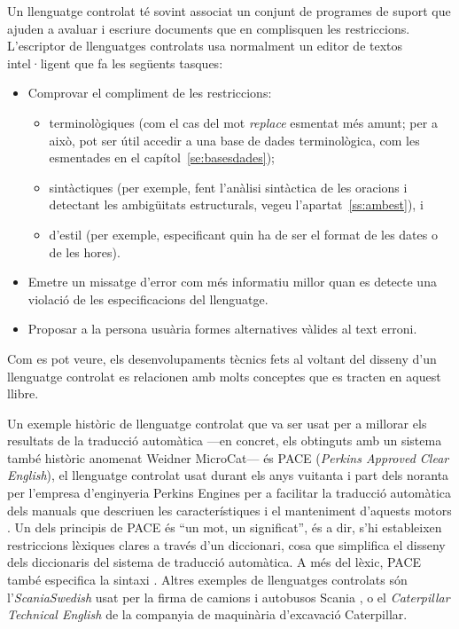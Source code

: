   Un llenguatge controlat té sovint associat un conjunt de programes
  de suport que ajuden a avaluar i escriure documents que en
  complisquen les restriccions. L'escriptor de llenguatges controlats
  usa normalment un editor de textos intel·ligent que fa les següents
  tasques:
\begin{itemize}
\item Comprovar el compliment de les restriccions:
  \begin{itemize}
  \item terminològiques (com el cas del mot \emph{replace} esmentat
    més amunt; per a això, pot ser útil accedir a una base de dades
    terminològica, com les esmentades en el
    capítol~\ref{se:basesdades});
  \item sintàctiques (per exemple, fent l'anàlisi sintàctica de les
    oracions i detectant les ambigüitats estructurals, vegeu
    l'apartat~\ref{ss:ambest}), i
  \item  d'estil (per exemple,
  especificant quin ha de ser el format de les dates o de les hores).
  \end{itemize}

\item Emetre un missatge d'error com més informatiu millor quan
  es detecte una violació de les especificacions del llenguatge.
\item Proposar a la persona usuària formes alternatives vàlides al
  text erroni.
\end{itemize}
Com es pot veure, els desenvolupaments tècnics fets al voltant del
disseny d'un llenguatge controlat es relacionen amb molts conceptes
que es tracten en aquest llibre.

Un exemple històric de llenguatge controlat que va ser usat per a
millorar els resultats de la traducció automàtica ---en concret, els
obtinguts amb un sistema també històric anomenat Weidner MicroCat---
és PACE (\emph{Perkins Approved Clear English}), el llenguatge
controlat usat durant els anys vuitanta i part dels noranta per
l'empresa d'enginyeria Perkins Engines per a facilitar la traducció
automàtica dels manuals que descriuen les característiques i el
manteniment d'aquests motors \citep{newton92b,douglas96p}. Un dels
principis de PACE és ``un mot, un significat'', és a dir, s'hi
estableixen restriccions lèxiques clares a través d'un diccionari,
cosa que simplifica el disseny dels diccionaris del sistema de
traducció automàtica. A més del lèxic, PACE també especifica la
sintaxi \cite[secció~8.3]{arnold94b}. Altres exemples de llenguatges
controlats són l'\emph{ScaniaSwedish} usat per la firma de camions i
autobusos Scania \citep{almqvist96p}, o el {\em Caterpillar Technical
  English} de la companyia de maquinària d'excavació Caterpillar.

